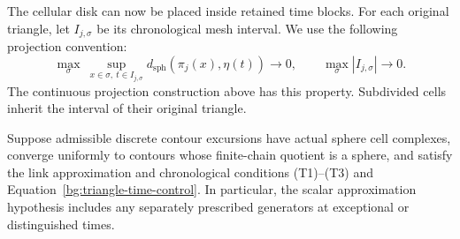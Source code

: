 The cellular disk can now be placed inside retained time blocks.
For each original triangle, let $I_{j,\sigma}$ be its chronological
mesh interval. We use the following projection convention:
\begin{equation}\label{bg:triangle-time-control}
 \max_{\sigma}\ \sup_{x\in\sigma,\ t\in I_{j,\sigma}}
 d_{\mathrm{sph}}(\pi_j(x),\eta(t))\longrightarrow0,
 \qquad
 \max_{\sigma}|I_{j,\sigma}|\longrightarrow0.
\end{equation}
The continuous projection construction above has this property.
Subdivided cells inherit the interval of their original triangle.

\begin{proposition}
\label{bg:sewing-stability}
Suppose admissible discrete contour excursions have actual sphere
cell complexes, converge uniformly to contours whose finite-chain
quotient is a sphere, and satisfy the link approximation and
chronological conditions (T1)--(T3) and
Equation~\ref{bg:triangle-time-control}. In particular, the scalar
approximation hypothesis includes any separately prescribed generators
at exceptional or distinguished times.


\end{proposition}
